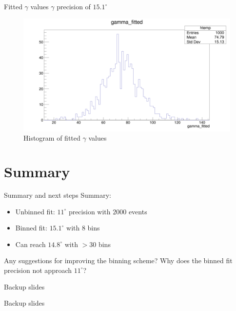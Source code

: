 \documentclass{beamer}
\begin{document}
\begin{frame}{Fitted $\gamma$ values}
  $\gamma$ precision of $15.1^\circ$
  \begin{figure}
    \centering
    \includegraphics[width = 1.0\textwidth]{OptimizedAmplitudePulls/gammafitted1K1K.png}
    \caption{Histogram of fitted $\gamma$ values}
  \end{figure}
\end{frame}

\section{Summary}
\begin{frame}{Summary and next steps}
  Summary:
  \begin{itemize}
    \item{Unbinned fit: $11^\circ$ precision with $2000$ events}
    \item{Binned fit: $15.1^\circ$ with $8$ bins}
    \item{Can reach $14.8^\circ$ with $>30$ bins}
  \end{itemize}
  Any suggestions for improving the binning scheme?
  Why does the binned fit precision not approach $11^\circ$?
\end{frame}

\begin{frame}{Backup slides}
  \begin{center}
    Backup slides
  \end{center}
\end{frame}
\end{document}
